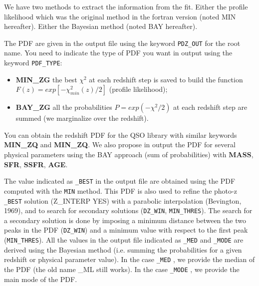 \documentclass[12pt]{article}
\begin{document}
We have two methods to extract the information from the fit. Either the profile likelihood which was the original method in the fortran version 
(noted MIN hereafter). Either the Bayesian method (noted BAY hereafter).

The PDF are given in the output file using the keyword \texttt{PDZ\_OUT} for the root name. You need to indicate the type of PDF you want in output using the keyword \texttt{PDF\_TYPE}:
\begin{itemize}
    \item {\bf MIN\_ZG} the best $\chi^2$ at each redshift step is saved to build the function $F(z)=exp[-\chi^2_{min}(z)/2]$ (profile likelihood);
    \item {\bf BAY\_ZG} all the probabilities $P=exp(-\chi^2/2)$ at each redshift step are summed (we marginalize over the redshift).
\end{itemize}
You can obtain the redshift PDF for the QSO library with similar keywords {\bf MIN\_ZQ} and {\bf MIN\_ZQ}. We also propose in output the PDF for several physical parameters using the BAY approach (sum of probabilities) with {\bf MASS}, {\bf SFR}, {\bf SSFR}, {\bf AGE}.


The value indicated as \texttt{\_BEST} in the output file are obtained using the PDF computed with the \texttt{MIN} method. This PDF is also used to refine the photo-z \texttt{\_BEST} solution (Z\_INTERP YES) with a parabolic interpolation (Bevington, 1969), and to search for secondary solutions  (\texttt{DZ\_WIN}, \texttt{MIN\_THRES}). The search for a secondary solution is done by imposing a minimum distance between the two peaks in the PDF (\texttt{DZ\_WIN}) and a minimum value with respect to the first peak (\texttt{MIN\_THRES}).
%
All the values in the output file indicated as \texttt{\_MED} and \texttt{\_MODE} are derived using the Bayesian method (i.e. summing the probabilities for a given redshift or physical parameter value). In the case \texttt{\_MED} , we provide the median of the PDF (the old name \_ML still works). In the case \texttt{\_MODE} , we provide the main mode of the PDF.
%
\end{document}
